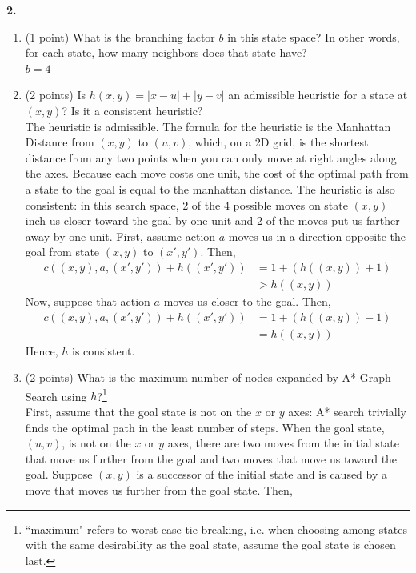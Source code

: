 \documentclass[12pt]{amsart}
\newenvironment{statement}[1]{\smallskip\noindent\color[rgb]{0.0,0.0,0.0} {\bf #1.}}{}
\theoremstyle{definition}
\theoremstyle{remark}
\newcommand{\1}{\mathds{1}}
\begin{document}
\begin{statement}{2}
\begin{enumerate}
    \item (1 point) What is the branching factor $b$ in this state space? In other words, for each state, how many neighbors does that state have? 
    \\ $b = 4$ 
    \item (2 points) Is $h(x,y) = |x - u| + |y - v|$ an admissible heuristic for a state at $(x, y)$? Is it a consistent heuristic?
    \\ The heuristic is admissible. The fornula for the heuristic is the Manhattan Distance from $(x, y)$ to $(u, v)$, which, on a 2D grid, is the shortest 
    distance from any two points when you can only move at right angles along the axes. Because each move costs one unit, the cost of the optimal path from a state to the goal is 
    equal to the manhattan distance. The heuristic is also consistent: in this search space, 2 of the 4 possible moves on state $(x, y)$ inch us closer toward the goal by one unit and 
    2 of the moves put us farther away by one unit. First, assume action $a$ moves us in a direction opposite the goal from state $(x, y)$ to $(x', y')$.
    Then, 
    \begin{align*}
        c((x, y), a, (x', y')) + h((x', y')) &= 1 + (h((x, y)) + 1)\\ &> h((x, y))
    \end{align*}
    Now, suppose that action $a$ moves us closer to the goal. Then, 
    \begin{align*}
        c((x, y), a, (x', y')) + h((x', y')) &= 1 + (h((x, y)) - 1)\\ &= h((x, y))
    \end{align*}
    Hence, $h$ is consistent.
    \item (2 points) What is the maximum number of nodes expanded by A* Graph Search using $h$?\footnote{\label{max}``maximum" refers to worst-case tie-breaking, i.e. when choosing among states with the same desirability as the goal state, assume the goal state is chosen last.}
    \\ First, assume that the goal state is not on the $x$ or $y$ axes: A* search trivially finds the optimal path in the least number of steps. 
    When the goal state, $(u, v)$, is not on the $x$ or $y$ axes, there are two moves from the initial state that move us further from the goal and two moves that move us toward the goal. 
    Suppose $(x, y)$ is a successor of the initial state and is caused by a move that moves us further from the goal state. Then, 

\end{enumerate}
\end{statement}
\end{document}
